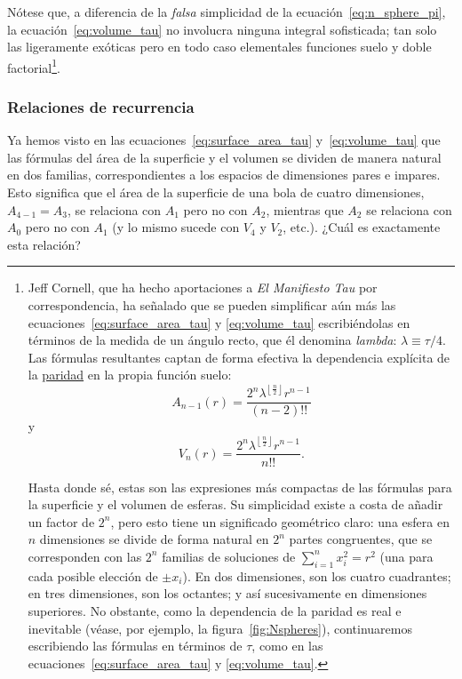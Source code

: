 Nótese que, a diferencia de la \emph{falsa} simplicidad de la ecuación~\eqref{eq:n_sphere_pi}, la ecuación~\eqref{eq:volume_tau} no involucra ninguna integral sofisticada; tan solo las ligeramente exóticas pero en todo caso elementales funciones suelo y doble factorial\footnote{


Jeff Cornell, que ha hecho aportaciones a \emph{El Manifiesto Tau} por correspondencia, ha señalado que se pueden simplificar aún más las ecuaciones~\eqref{eq:surface_area_tau} y \eqref{eq:volume_tau} escribiéndolas en términos de la medida de un ángulo recto, que él denomina \emph{lambda}: $\lambda \equiv \tau/4$. Las fórmulas resultantes captan de forma efectiva la dependencia explícita de la \href{https://es.wikipedia.org/wiki/N%C3%BAmeros_pares_e_impares}{paridad} en la propia función suelo: 
\[
  A_{n-1}(r) = \frac{2^n\lambda^{\left\lfloor \frac{n}{2} \right\rfloor} r^{n-1}}{(n-2)!!}
\]
y 
\[
  V_n(r) = \frac{2^n\lambda^{\left\lfloor \frac{n}{2} \right\rfloor} r^{n-1}}{n!!}.
\]

Hasta donde sé, estas son las expresiones más compactas de las fórmulas para la superficie y el volumen de esferas. Su simplicidad existe a costa de añadir un factor de $2^n$, pero esto tiene un significado geométrico claro: una esfera en $n$ dimensiones se divide de forma natural en $2^n$ partes congruentes, que se corresponden con las $2^n$ familias de soluciones de $\sum_{i=1}^{n} x_i^2 = r^2$ (una para cada posible elección de $\pm x_i$). En dos dimensiones, son los cuatro cuadrantes; en tres dimensiones, son los octantes; y así sucesivamente en dimensiones superiores. No obstante, como la dependencia de la paridad es real e inevitable (véase, por ejemplo, la figura~\ref{fig:Nspheres}), continuaremos escribiendo las fórmulas en términos de $\tau$, como en las ecuaciones~\eqref{eq:surface_area_tau} y \eqref{eq:volume_tau}.
}.



\subsubsection{Relaciones de recurrencia} %
\label{sec:recurrences}

Ya hemos visto en las ecuaciones~\eqref{eq:surface_area_tau} y~\eqref{eq:volume_tau} que las fórmulas del área de la superficie y el volumen se dividen de manera natural en dos familias, correspondientes a los espacios de dimensiones pares e impares. Esto significa que el área de la superficie de una bola de cuatro dimensiones, $A_{4-1} = A_3$, se relaciona con $A_1$ pero no con $A_2$, mientras que $A_2$ se relaciona con $A_0$ pero no con $A_1$ (y lo mismo sucede con $V_4$ y $V_2$, etc.). ¿Cuál es exactamente esta relación?

